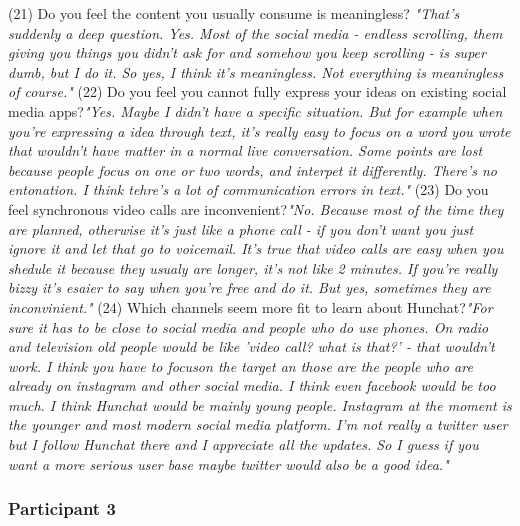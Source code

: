\documentclass[12pt]{article}
\begin{document}
(21) Do you feel the content you usually consume is meaningless? \textit{"That's suddenly a deep question. Yes. Most of the social media - endless scrolling, them giving you things you didn't ask for and somehow you keep scrolling - is super dumb, but I do it. So yes, I think it's meaningless. Not everything is meaningless of course."}
(22) Do you feel you cannot fully express your ideas on existing social media apps?\textit{"Yes. Maybe I didn't have a specific situation. But for example when you're expressing a idea through text, it's really easy to focus on a word you wrote that wouldn't have matter in a normal live conversation. Some points are lost because people focus on one or two words, and interpet it differently. There's no entonation. I think tehre's a lot of communication errors in text."}
(23) Do you feel synchronous video calls are inconvenient?\textit{"No. Because most of the time they are planned, otherwise it's just like a phone call - if you don't want you just ignore it and let that go to voicemail. It's true that video calls are easy when you shedule it because they usualy are longer, it's not like 2 minutes. If you're really bizzy it's esaier to say when you're free and do it. But yes, sometimes they are inconvinient."}
(24) Which channels seem more fit to learn about Hunchat?\textit{"For sure it has to be close to social media and people who do use phones. On radio and television old people would be like 'video call? what is that?' - that wouldn't work. I think you have to focuson the target an those are the people who are already on instagram and other social media. I think even facebook would be too much. I think Hunchat would be mainly young people. Instagram at the moment is the younger and most modern social media platform. I'm not really a twitter user but I follow Hunchat there and I appreciate all the updates. So I guess if you want a more serious user base maybe twitter would also be a good idea."}

\subsubsection{Participant 3}
\end{document}
